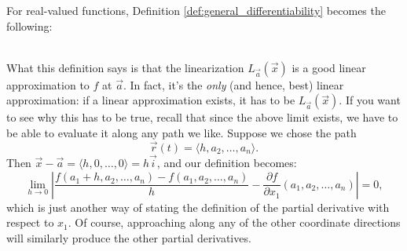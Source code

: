 For real-valued functions, Definition \ref{def:general_differentiability} becomes the following:

\\

What this definition says is that the linearization $L_{\vec{a}}(\vec{x})$ is a good linear approximation to $f$ at $\vec{a}$. In fact, it's the {\em only} (and hence, best) linear approximation: if a linear approximation exists, it has to be $L_{\vec{a}}(\vec{x})$. If you want to see why this has to be true, recall that since the above limit exists, we have to be able to evaluate it along any path we like. Suppose we chose the path 
\[
\vec{r}(t) = \langle h,a_2,\ldots, a_n\rangle.
\]
Then $\vec{x}-\vec{a} = \langle h,0,\ldots, 0\rangle = h\vec{i}$, and our definition becomes:
\[
\lim_{h\to 0}\left\lvert\frac{f(a_1+h,a_2,\ldots, a_n)-f(a_1,a_2,\ldots, a_n)}{h} - \frac{\partial f}{\partial x_1}(a_1,a_2,\ldots, a_n)\right\rvert = 0,
\]
which is just another way of stating the definition of the partial derivative with respect to $x_1$. Of course, approaching along any of the other coordinate directions will similarly produce the other partial derivatives.


